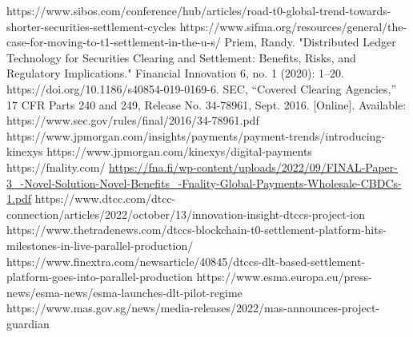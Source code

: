 \documentclass[conference]{IEEEtran}
\begin{document}
\begin{thebibliography}{00}
 https://www.sibos.com/conference/hub/articles/road-t0-global-trend-towards-shorter-securities-settlement-cycles
 https://www.sifma.org/resources/general/the-case-for-moving-to-t1-settlement-in-the-u-s/
 Priem, Randy. "Distributed Ledger Technology for Securities Clearing and Settlement: Benefits, Risks, and Regulatory Implications." Financial Innovation 6, no. 1 (2020): 1–20. https://doi.org/10.1186/s40854-019-0169-6.
 SEC, “Covered Clearing Agencies,” 17 CFR Parts 240 and 249, Release No. 34-78961, Sept. 2016. [Online]. Available: https://www.sec.gov/rules/final/2016/34-78961.pdf
 https://www.jpmorgan.com/insights/payments/payment-trends/introducing-kinexys
 https://www.jpmorgan.com/kinexys/digital-payments
 https://fnality.com/
 \url{https://fna.fi/wp-content/uploads/2022/09/FINAL-Paper-3_-Novel-Solution-Novel-Benefits_-Fnality-Global-Payments-Wholesale-CBDCs-1.pdf}
 https://www.dtcc.com/dtcc-connection/articles/2022/october/13/innovation-insight-dtccs-project-ion
 https://www.thetradenews.com/dtccs-blockchain-t0-settlement-platform-hits-milestones-in-live-parallel-production/
 https://www.finextra.com/newsarticle/40845/dtccs-dlt-based-settlement-platform-goes-into-parallel-production
 https://www.esma.europa.eu/press-news/esma-news/esma-launches-dlt-pilot-regime
 https://www.mas.gov.sg/news/media-releases/2022/mas-announces-project-guardian
\end{thebibliography}
\vspace{12pt}
\end{document}
